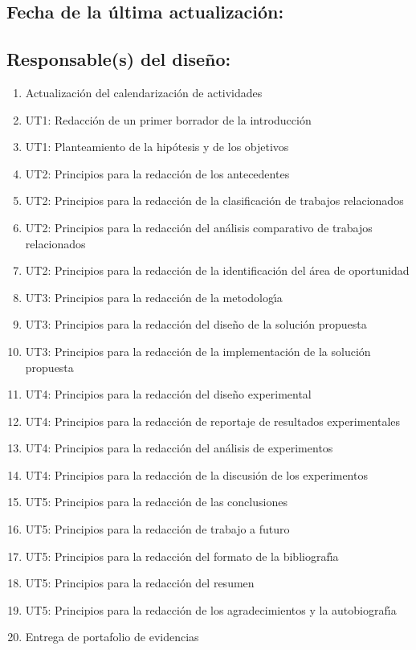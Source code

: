 \documentclass[10 pt]{article}
\begin{document}
\subsection{Fecha de la \'{u}ltima actualizaci\'{o}n:} 
\subsection{Responsable(s) del dise\~{n}o:}
\fbox{\parbox{9cm}{\begin{itemize}[label={}]
\item {\nroger~\roger}
\item {\nelisa~\elisa}
\end{itemize}}}
\newpage



\begin{enumerate}[itemsep=-2pt]
\item Actualizaci\'{o}n del calendarizaci\'{o}n de actividades
\item UT1: Redacci\'{o}n de un  primer borrador de la introducci\'{o}n
\item UT1: Planteamiento de la hip\'{o}tesis y de los objetivos
\item UT2: Principios para la redacci\'{o}n de los antecedentes
\item UT2: Principios para la redacci\'{o}n de la clasificaci\'{o}n de trabajos relacionados
\item UT2: Principios para la redacci\'{o}n del an\'{a}lisis comparativo de trabajos relacionados
\item UT2: Principios para la redacci\'{o}n de la identificaci\'{o}n del \'{a}rea de oportunidad
\item UT3: Principios para la redacci\'{o}n de la metodolog\'{\i}a
\item UT3: Principios para la redacci\'{o}n del dise\~{n}o de la soluci\'{o}n propuesta
\item UT3: Principios para la redacci\'{o}n de la implementaci\'{o}n de la soluci\'{o}n propuesta
\item UT4: Principios para la redacci\'{o}n del dise\~{n}o experimental
\item UT4: Principios para la redacci\'{o}n de reportaje de resultados experimentales
\item UT4: Principios para la redacci\'{o}n del an\'{a}lisis de experimentos
\item UT4: Principios para la redacci\'{o}n de la discusi\'{o}n de los experimentos
\item UT5: Principios para la redacci\'{o}n de las conclusiones
\item UT5: Principios para la redacci\'{o}n de trabajo a futuro
\item UT5: Principios para la redacci\'{o}n del formato de la bibliograf\'{\i}a
\item UT5: Principios para la redacci\'{o}n del resumen
\item UT5: Principios para la redacci\'{o}n de los agradecimientos y la autobiograf\'{\i}a
\item Entrega de portafolio de evidencias
\end{enumerate}
\end{document}
